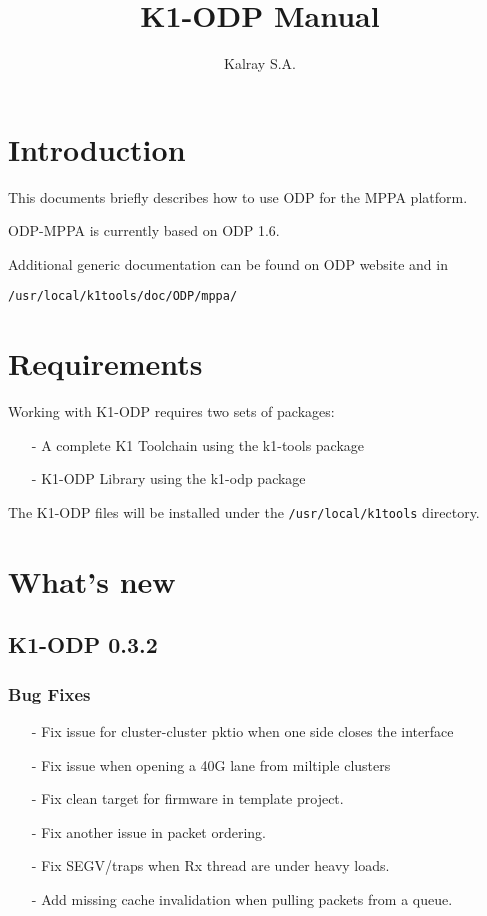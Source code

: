 \documentclass{trkalray}
\author{%
Kalray S.A.\autref{1}
}
\institute{%
\autlabel{1} \email{support@kalray.eu},
Kalray S.A.
}
\title{K1-ODP Manual}
\begin{document}
\maketitle

\tableofcontents

\newpage
\section{Introduction}

This documents briefly describes how to use ODP for the MPPA platform.

ODP-MPPA is currently based on ODP 1.6.

Additional generic documentation can be found on ODP website and in
\begin{lstlisting}
/usr/local/k1tools/doc/ODP/mppa/
\end{lstlisting}

\section{Requirements}

Working with K1-ODP requires two sets of packages:
\begin{itemize}
\item[-]{A complete K1 Toolchain using the k1-tools package}
\item[-]{K1-ODP Library using the k1-odp package}
\end{itemize}

The K1-ODP files will be installed under the
\texttt{/usr/local/k1tools} directory.

\section{What's new}
\subsection{K1-ODP 0.3.2}
\subsubsection{Bug Fixes}
\begin{itemize}
\item[-]{Fix issue for cluster-cluster pktio when one side closes the
  interface}
\item[-]{Fix issue when opening a 40G lane from miltiple clusters}
\item[-]{Fix clean target for firmware in template project.}
\item[-]{Fix another issue in packet ordering.}
\item[-]{Fix SEGV/traps when Rx thread are under heavy loads.}
\item[-]{Add missing cache invalidation when pulling packets from a queue.}
\end{itemize}
\end{document}
